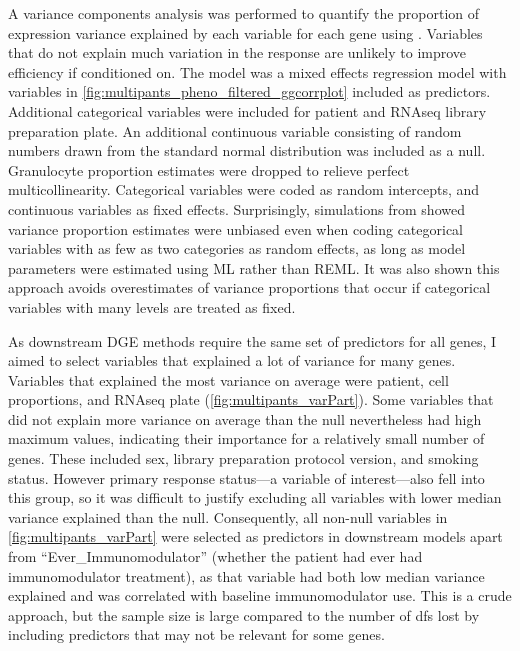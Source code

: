 A variance components analysis was performed to quantify the proportion of expression variance explained by each variable for each gene using  \autocite{hoffman2016VariancePartitionInterpretingDrivers}.
Variables that do not explain much variation in the response are unlikely to improve efficiency if conditioned on.
The model was a mixed effects regression model with variables in \cref{fig:multipants_pheno_filtered_ggcorrplot} included as predictors.
Additional categorical variables were included for patient and \gls{RNAseq} library preparation plate.
An additional continuous variable consisting of random numbers drawn from the standard normal distribution was included as a null.
Granulocyte proportion estimates were dropped to relieve perfect multicollinearity.
Categorical variables were coded as random intercepts, and continuous variables as fixed effects.
Surprisingly, simulations from \textcite{hoffman2016VariancePartitionInterpretingDrivers} showed variance proportion estimates were unbiased even when coding categorical variables with as few as two categories as random effects,
as long as model parameters were estimated using \gls{ML} rather than \gls{REML}. 
It was also shown this approach avoids overestimates of variance proportions that occur if categorical variables with many levels are treated as fixed.

As downstream \gls{DGE} methods require the same set of predictors for all genes, I aimed to select variables that explained a lot of variance for many genes.
Variables that explained the most variance on average were patient, cell proportions, and \gls{RNAseq} plate (\cref{fig:multipants_varPart}).
Some variables that did not explain more variance on average than the null nevertheless had high maximum values, indicating their importance for a relatively small number of genes.
These included sex, library preparation protocol version, and smoking status.
However primary response status---a variable of interest---also fell into this group,
so it was difficult to justify excluding all variables with lower median variance explained than the null.
Consequently, all non-null variables in \cref{fig:multipants_varPart} were selected as predictors in downstream models apart from \enquote{Ever\_Immunomodulator} 
(whether the patient had ever had immunomodulator treatment), 
as that variable had both low median variance explained and was correlated with baseline immunomodulator use.
This is a crude approach, but the sample size is large compared to the number of \glspl{df} lost by including predictors that may not be relevant for some genes.

